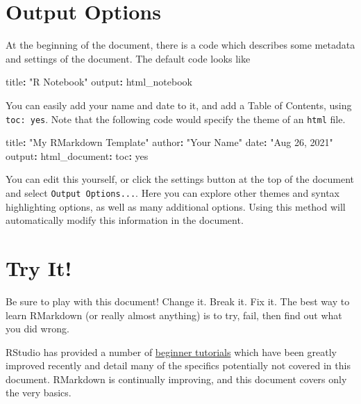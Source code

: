 \documentclass[
]{book}
\newenvironment{Shaded}{\begin{snugshade}}{\end{snugshade}}
\newcommand{\NormalTok}[1]{#1}
\newcommand{\OperatorTok}[1]{\textcolor[rgb]{0.81,0.36,0.00}{\textbf{#1}}}
\newcommand{\StringTok}[1]{\textcolor[rgb]{0.31,0.60,0.02}{#1}}
\begin{document}
\hypertarget{output-options}{%
\section{Output Options}\label{output-options}}

At the beginning of the document, there is a code which describes some metadata and settings of the document. The default code looks like

\begin{Shaded}
\begin{Highlighting}[]
\NormalTok{  title}\OperatorTok{:}\StringTok{ "R Notebook"}
\NormalTok{  output}\OperatorTok{:}\StringTok{ }\NormalTok{html_notebook}
\end{Highlighting}
\end{Shaded}

You can easily add your name and date to it, and add a Table of Contents, using \texttt{toc:\ yes}. Note that the following code would specify the theme of an \texttt{html} file.

\begin{Shaded}
\begin{Highlighting}[]
\NormalTok{  title}\OperatorTok{:}\StringTok{ "My RMarkdown Template"}
\NormalTok{  author}\OperatorTok{:}\StringTok{ "Your Name"}
\NormalTok{  date}\OperatorTok{:}\StringTok{ "Aug 26, 2021"}
\NormalTok{  output}\OperatorTok{:}
\StringTok{    }\NormalTok{html_document}\OperatorTok{:}\StringTok{ }
\StringTok{      }\NormalTok{toc}\OperatorTok{:}\StringTok{ }\NormalTok{yes}
\end{Highlighting}
\end{Shaded}

You can edit this yourself, or click the settings button at the top of the document and select \texttt{Output\ Options...}. Here you can explore other themes and syntax highlighting options, as well as many additional options. Using this method will automatically modify this information in the document.

\hypertarget{try-it}{%
\section{Try It!}\label{try-it}}

Be sure to play with this document! Change it. Break it. Fix it. The best way to learn RMarkdown (or really almost anything) is to try, fail, then find out what you did wrong.

RStudio has provided a number of \href{http://rmarkdown.rstudio.com/lesson-1.html}{beginner tutorials} which have been greatly improved recently and detail many of the specifics potentially not covered in this document. RMarkdown is continually improving, and this document covers only the very basics.
\end{document}
